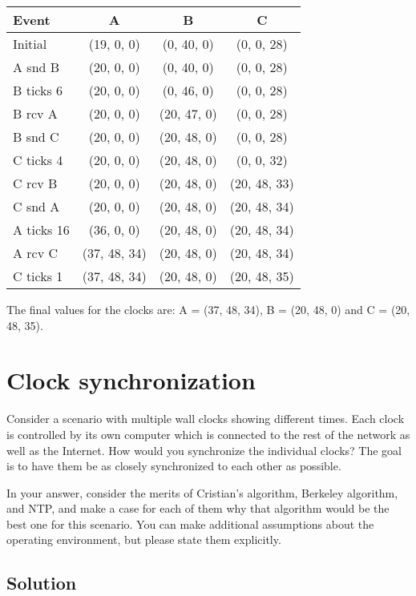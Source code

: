 \documentclass[12pt,a4paper,titlepage]{article}
\begin{document}
\begin{tabular}{ | l | c | c | c |} \hline
\textbf{Event} & \textbf{A} & \textbf{B} & \textbf{C} \\ \hline
Initial & (19, 0, 0) & (0, 40, 0) & (0, 0, 28) \\ \hline
A snd B & (20, 0, 0) & (0, 40, 0) & (0, 0, 28) \\ \hline
B ticks 6 & (20, 0, 0) & (0, 46, 0) & (0, 0, 28) \\ \hline
B rcv A & (20, 0, 0) & (20, 47, 0) & (0, 0, 28) \\ \hline
B snd C & (20, 0, 0) & (20, 48, 0) & (0, 0, 28) \\ \hline
C ticks 4 & (20, 0, 0) & (20, 48, 0) & (0, 0, 32) \\ \hline
C rcv B & (20, 0, 0) & (20, 48, 0) & (20, 48, 33) \\ \hline
C snd A & (20, 0, 0) & (20, 48, 0) & (20, 48, 34) \\ \hline
A ticks 16 & (36, 0, 0) & (20, 48, 0) & (20, 48, 34) \\ \hline
A rcv C & (37, 48, 34) & (20, 48, 0) & (20, 48, 34) \\ \hline
C ticks 1 & (37, 48, 34) & (20, 48, 0) & (20, 48, 35) \\ \hline
\end{tabular}

The final values for the clocks are: A = (37, 48, 34), B = (20, 48, 0) and C = (20, 48, 35).

\section{Clock synchronization}

Consider a scenario with multiple wall clocks showing different times. Each clock is controlled by its own computer which is connected to the rest of the network as well as the Internet. How would you synchronize the individual clocks? The goal is to have them be as closely synchronized to each other as possible.

In your answer, consider the merits of Cristian's algorithm, Berkeley algorithm, and NTP, and make a case for each of them why that algorithm would be the best one for this scenario. You can make additional assumptions about the operating environment, but please state them explicitly.

\subsection{Solution}
\end{document}

